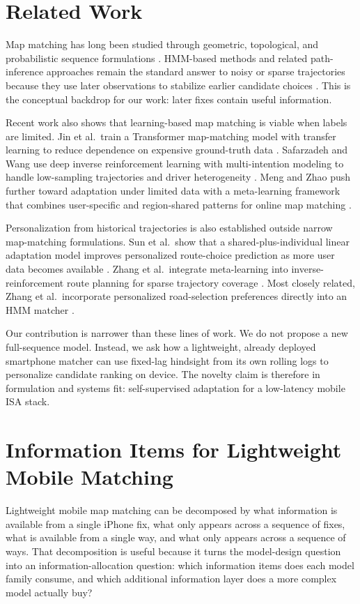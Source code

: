 \documentclass{article}
\begin{document}
\section{Related Work}
Map matching has long been studied through geometric, topological, and probabilistic sequence formulations \cite{quddus2007}. HMM-based methods and related path-inference approaches remain the standard answer to noisy or sparse trajectories because they use later observations to stabilize earlier candidate choices \cite{newson2009,lou2009,goh2012,he2013,hunter2014,quddus2015,jagadeesh2017,che2018}. This is the conceptual backdrop for our work: later fixes contain useful information.

Recent work also shows that learning-based map matching is viable when labels are limited. Jin et al.\ train a Transformer map-matching model with transfer learning to reduce dependence on expensive ground-truth data \cite{jin2022transformer}. Safarzadeh and Wang use deep inverse reinforcement learning with multi-intention modeling to handle low-sampling trajectories and driver heterogeneity \cite{safarzadeh2024midirl}. Meng and Zhao push further toward adaptation under limited data with a meta-learning framework that combines user-specific and region-shared patterns for online map matching \cite{meng2026mpm}.

Personalization from historical trajectories is also established outside narrow map-matching formulations. Sun et al.\ show that a shared-plus-individual linear adaptation model improves personalized route-choice prediction as more user data becomes available \cite{sun2023humancentric}. Zhang et al.\ integrate meta-learning into inverse-reinforcement route planning for sparse trajectory coverage \cite{zhang2024metairl}. Most closely related, Zhang et al.\ incorporate personalized road-selection preferences directly into an HMM matcher \cite{zhang2025pphmm}.

Our contribution is narrower than these lines of work. We do not propose a new full-sequence model. Instead, we ask how a lightweight, already deployed smartphone matcher can use fixed-lag hindsight from its own rolling logs to personalize candidate ranking on device. The novelty claim is therefore in formulation and systems fit: self-supervised adaptation for a low-latency mobile ISA stack.

\section{Information Items for Lightweight Mobile Matching}
Lightweight mobile map matching can be decomposed by what information is available from a single iPhone fix, what only appears across a sequence of fixes, what is available from a single way, and what only appears across a sequence of ways. That decomposition is useful because it turns the model-design question into an information-allocation question: which information items does each model family consume, and which additional information layer does a more complex model actually buy?
\end{document}
